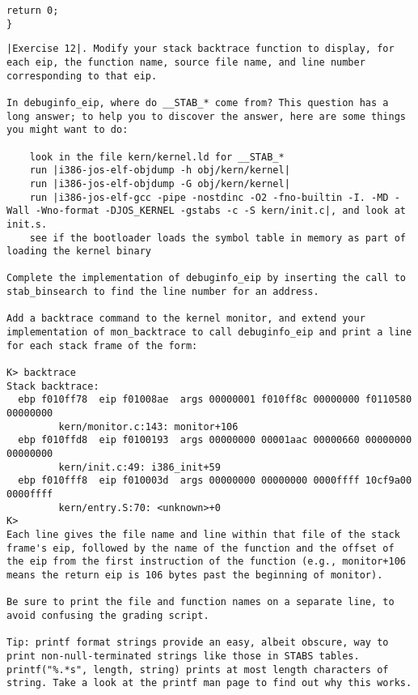 \documentclass{article}
\begin{document}
\begin{CJK*}{UTF8}{gkai}
\begin{lstlisting}[style=ccode, title={\scriptsize \ttfamily \bfseries kern/monitor.c}]
    return 0;
}\end{lstlisting}

\vspace{4em}

\begin{lstlisting}[style=exercise]
|Exercise 12|. Modify your stack backtrace function to display, for each eip, the function name, source file name, and line number corresponding to that eip.

In debuginfo_eip, where do __STAB_* come from? This question has a long answer; to help you to discover the answer, here are some things you might want to do:

    look in the file kern/kernel.ld for __STAB_*
    run |i386-jos-elf-objdump -h obj/kern/kernel|
    run |i386-jos-elf-objdump -G obj/kern/kernel|
    run |i386-jos-elf-gcc -pipe -nostdinc -O2 -fno-builtin -I. -MD -Wall -Wno-format -DJOS_KERNEL -gstabs -c -S kern/init.c|, and look at init.s.
    see if the bootloader loads the symbol table in memory as part of loading the kernel binary

Complete the implementation of debuginfo_eip by inserting the call to stab_binsearch to find the line number for an address.

Add a backtrace command to the kernel monitor, and extend your implementation of mon_backtrace to call debuginfo_eip and print a line for each stack frame of the form:

K> backtrace
Stack backtrace:
  ebp f010ff78  eip f01008ae  args 00000001 f010ff8c 00000000 f0110580 00000000
         kern/monitor.c:143: monitor+106
  ebp f010ffd8  eip f0100193  args 00000000 00001aac 00000660 00000000 00000000
         kern/init.c:49: i386_init+59
  ebp f010fff8  eip f010003d  args 00000000 00000000 0000ffff 10cf9a00 0000ffff
         kern/entry.S:70: <unknown>+0
K> 
Each line gives the file name and line within that file of the stack frame's eip, followed by the name of the function and the offset of the eip from the first instruction of the function (e.g., monitor+106 means the return eip is 106 bytes past the beginning of monitor).

Be sure to print the file and function names on a separate line, to avoid confusing the grading script.

Tip: printf format strings provide an easy, albeit obscure, way to print non-null-terminated strings like those in STABS tables. printf("%.*s", length, string) prints at most length characters of string. Take a look at the printf man page to find out why this works.


\end{lstlisting}
\end{CJK*}
\end{document}
